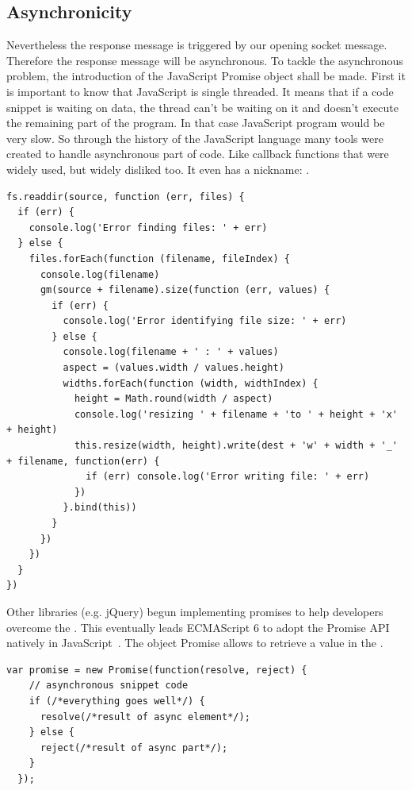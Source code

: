 \documentclass[11pt, a4paper, twoside, openright, openany]{article} %
\begin{document}
\subsection{Asynchronicity}

Nevertheless the response message is triggered by our opening socket message.
Therefore the response message will be asynchronous.
\newline
To tackle the asynchronous problem, the introduction of the JavaScript Promise object shall be made.
First it is important to know that JavaScript is single threaded.
It means that if a code snippet is waiting on data, the thread can't be waiting on it
and doesn't execute the remaining part of the program. In that case JavaScript program
would be very slow. So through the history of the JavaScript language many tools were
created to handle asynchronous part of code. Like callback functions that were widely
used, but widely disliked too. It even has a nickname: .
\bigbreak

\begin{lstlisting}[caption={Example of Callback Hell with its typical pyramid shape}, captionpos=b]
  fs.readdir(source, function (err, files) {
  if (err) {
    console.log('Error finding files: ' + err)
  } else {
    files.forEach(function (filename, fileIndex) {
      console.log(filename)
      gm(source + filename).size(function (err, values) {
        if (err) {
          console.log('Error identifying file size: ' + err)
        } else {
          console.log(filename + ' : ' + values)
          aspect = (values.width / values.height)
          widths.forEach(function (width, widthIndex) {
            height = Math.round(width / aspect)
            console.log('resizing ' + filename + 'to ' + height + 'x' + height)
            this.resize(width, height).write(dest + 'w' + width + '_' + filename, function(err) {
              if (err) console.log('Error writing file: ' + err)
            })
          }.bind(this))
        }
      })
    })
  }
})
\end{lstlisting}
\leavevmode \newline

Other libraries (e.g. jQuery) begun implementing promises to help developers overcome the .
This eventually leads ECMAScript 6 to adopt the Promise API~\cite{promise} natively in JavaScript~\cite{ecmaPromise}.
The object Promise allows to retrieve a value in the .
\bigbreak

\begin{lstlisting}[caption={Structure of a Promise}, captionpos=b]
  var promise = new Promise(function(resolve, reject) {
    // asynchronous snippet code
    if (/*everything goes well*/) {
      resolve(/*result of async element*/);
    } else {
      reject(/*result of async part*/);
    }
  });
\end{lstlisting}
\leavevmode \newline
\end{document}
